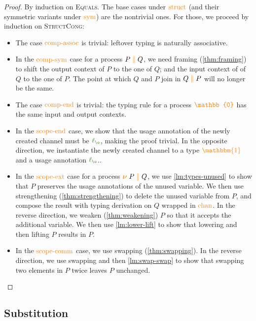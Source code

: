 \documentclass[a4paper,UKenglish,cleveref,autoref,thm-restate,authorcolumns]{lipics-v2019}
\theoremstyle{definition}
\newcommand{\constr}[1]{\textcolor{BurntOrange}{\operatorname{#1}}}
\newcommand{\func}[1]{\textcolor{OliveGreen}{\operatorname{#1}}}
\newcommand{\PO}{\constr{\mathbb{0}}}
\newcommand{\comp}[2]{#1 \; \constr{\parallel} \; #2}
\newcommand{\new}{\constr{\boldsymbol{\nu}} \;}
\newcommand{\unit}{\constr{\mathbbm{1}}}
\newcommand{\lz}{\func{\ell_{\o}}}
\begin{document}
\begin{proof}
  By induction on \textsc{Equals}.
  The base cases under $\constr{struct}$ (and their symmetric variants under $\constr{sym}$) are the nontrivial ones.
  For those, we proceed by induction on \textsc{StructCong}:
  \begin{itemize}
    \item
      The case $\constr{comp-assoc}$ is trivial: leftover typing is naturally associative.
    \item
      In the $\constr{comp-sym}$ case for a process $\comp{P}{Q}$, we need framing (\autoref{thm:framing}) to shift the output context of $P$ to the one of $Q$; and the input context of of $Q$ to the one of $P$.
      The point at which $Q$ and $P$ join in $\comp{Q}{P}$ will no longer be the same.
    \item
      The case $\constr{comp-end}$ is trivial: the typing rule for a process $\PO$ has the same input and output contexts.
    \item
      In the $\constr{scope-end}$ case, we show that the usage annotation of the newly created channel must be $\lz$, making the proof trivial.
      In the opposite direction, we instantiate the newly created channel to a type $\unit$ and a usage annotation $\lz$..
    \item
      In the $\constr{scope-ext}$ case for a process $\new \comp{P}{Q}$, we use \autoref{lm:types-unused} to show that $P$ preserves the usage annotations of the unused variable.
      We then use strengthening (\autoref{thm:strengthening}) to delete the unused variable from $P$, and compose the result with typing derivation on $Q$ wrapped in $\constr{chan}$.
      In the reverse direction, we weaken (\autoref{thm:weakening}) $P$ so that it accepts the additional variable.
      We then use \autoref{lm:lower-lift} to show that lowering and then lifting $P$ results in $P$.
    \item
      In the $\constr{scope-comm}$ case, we use swapping (\autoref{thm:swapping}).
      In the reverse direction, we use swapping and then \autoref{lm:swap-swap} to show that swapping two elements in $P$ twice leaves $P$ unchanged.
  \end{itemize}
\end{proof}

\subsection{Substitution}
\label{substitution}
\end{document}
